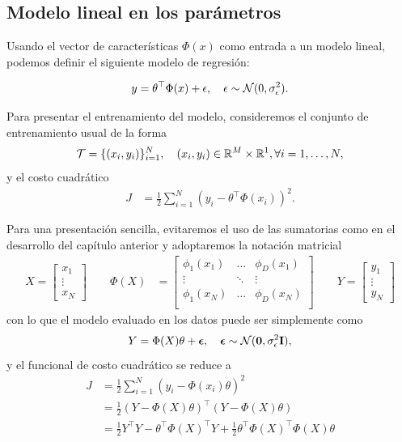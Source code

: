 \subsection{Modelo lineal en los parámetros} 
\label{sub:modelo_lineal_param}


Usando el vector de características $\Phi(x)$ como entrada a un modelo lineal, podemos definir el siguiente modelo de regresión: 

\begin{equation}
    y = \theta^\top\Phi(x) + \epsilon,\quad \epsilon\sim{\mathcal N}(0,\sigma_\epsilon^2).
\end{equation}

Para presentar el entrenamiento del modelo, consideremos el conjunto de entrenamiento usual de la forma
\begin{equation}
    {\mathcal T} = \{(x_i,y_i)\}_{i=1}^N,\quad (x_i, y_i)\in{\mathbb R}^M\times{\mathbb R}^1,\forall i=1,\ldots,N,
    \label{eq:training_set_nl}
\end{equation}
y el costo cuadrático 
\begin{align}
    J &= \frac{1}{2} \sum_{i=1}^N(y_i - \theta^\top\Phi(x_i))^2.
\end{align}

Para una presentación sencilla, evitaremos el uso de las sumatorias como en el desarrollo del capítulo anterior y adoptaremos la notación matricial 
\begin{align}
    X = \left[ \begin{matrix} x_1 \\ \vdots \\ x_N \end{matrix} \right]\qquad
    \Phi(X) &= \left[ \begin{matrix} \phi_1(x_1)& \ldots & \phi_D(x_1)\\
    \vdots & \ddots & \vdots \\
    \phi_1(x_N) & \ldots & \phi_D(x_N)\\
    \end{matrix} \right]\qquad
    Y = \left[ \begin{matrix} y_1 \\ \vdots \\ y_N \end{matrix} \right]
\end{align}
con lo que el modelo evaluado en los datos puede ser simplemente como 
\begin{equation}
    Y = \Phi(X)\theta + {\bm \epsilon},\quad {\bm \epsilon}\sim{\mathcal N}(\mathbf{0},\sigma_\epsilon^2\mathbf{I}),
\end{equation}
y el funcional de costo cuadrático se reduce a
\begin{align}
    J &= \frac{1}{2} \sum_{i=1}^N(y_i - \Phi(x_i)\theta)^2\\
    &= \frac{1}{2} (Y-\Phi(X)\theta)^\top(Y-\Phi(X)\theta)\nonumber\\
    &= \frac{1}{2}Y^\top Y - \theta^\top\Phi(X)^\top Y + \frac{1}{2}\theta^\top\Phi(X)^\top\Phi(X)\theta\nonumber
\end{align}

